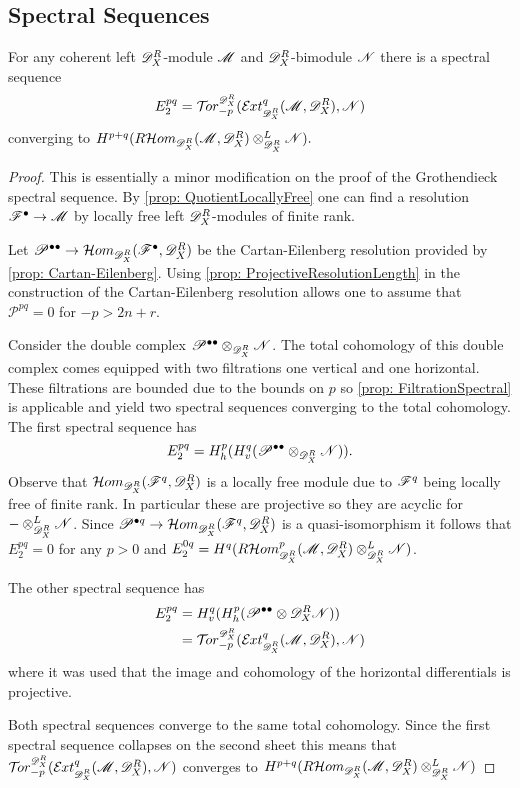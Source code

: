 \subsection{Spectral Sequences}
\begin{proposition}\label{prop: SpectralTorExt}
  For any coherent left $\mathscr{D}_X^R$-module $\mathscr{M}$ and $\mathscr{D}_X^R$-bimodule $\mathscr{N}$ there is a spectral sequence
  $$E_2^{pq}= \Tr{\D_X^R}{-p}(\Ex{\D_X^R}{q}(\M,\D_X^R), \N) $$
  converging to $H^{p+q} (R\mathcal{H}om_{\mathscr{D}_X^R}(\mathscr{M},\mathscr{D}_X^R)\otimes_{\mathscr{D}_X^R}^L \mathscr{N}).$
\end{proposition}
\begin{proof}
  This is essentially a minor modification on the proof of the Grothendieck spectral sequence.
  By \cref{prop: QuotientLocallyFree} one can find a resolution $\mathscr{F}^\bullet \to \mathscr{M}$ by locally free left $\mathscr{D}_X^R$-modules of finite rank.

  Let $\mathscr{P}^{\bullet\bullet}\to \mathcal{H}om_{\mathscr{D}_X^R}(\mathscr{F}^{\bullet},\mathscr{D}_X^R)$ be the Cartan-Eilenberg resolution provided by \cref{prop: Cartan-Eilenberg}.
  Using \cref{prop: ProjectiveResolutionLength} in the construction of the Cartan-Eilenberg resolution allows one to assume that $\mathscr{P}^{pq}=0$ for $-p>2n + r$.

  Consider the double complex $\mathscr{P}^{\bullet \bullet}\otimes_{\mathscr{D}_X^R}\mathscr{N}$.
  The total cohomology of this double complex comes equipped with two filtrations one vertical and one horizontal.
  These filtrations are bounded due to the bounds on $p$ so \cref{prop: FiltrationSpectral} is applicable and yield two spectral sequences converging to the total cohomology.
  The first spectral sequence has
  $$E_{2}^{pq} = H^p_h(H^q_v( \mathscr{P}^{\bullet \bullet}\otimes_{\mathscr{D}_X^R}\mathscr{N})).$$
  Observe that $\mathcal{H}om_{\mathscr{D}_X^R}(\mathscr{F}^q, \mathscr{D}_X^R)$ is a locally free module due to $\mathscr{F}^q$ being locally free of finite rank.
  In particular these are projective so they are acyclic for ${-}\otimes_{\mathscr{D}_X^R}^L \mathscr{N}$.
  Since $\mathscr{P}^{\bullet q}\to \mathcal{H}om_{\mathscr{D}_X^R}(\mathscr{F}^q,\mathscr{D}_X^R)$ is a quasi-isomorphism it follows that $E_2^{pq}=0$ for any $p>0$ and $E_2^{0q} = H^{q} (R\mathcal{H}om_{\mathscr{D}_X^R}^p(\mathscr{M},\mathscr{D}_X^R)\otimes_{\mathscr{D}_X^R}^L \mathscr{N})$.

  The other spectral sequence has
  \begin{align*}
      E_2^{pq} &= H^q_v(H^p_h(\mathscr{P}^{\bullet\bullet}\otimes \D_X^R\N))\\
      &=  \Tr{\D_X^R}{-p}(\Ex{\D_X^R}{q}(\M,\D_X^R), \N)
  \end{align*}
  where it was used that the image and cohomology of the horizontal differentials is projective.

  Both spectral sequences converge to the same total cohomology.
  Since the first spectral sequence collapses on the second sheet this means that $\Tr{\D_X^R}{-p}(\Ex{\D_X^R}{q}(\M,\D_X^R), \N)$ converges to $H^{p+q}( R\mathcal{H}om_{\mathscr{D}_X^R}(\mathscr{M},\mathscr{D}_X^R)\otimes_{\mathscr{D}_X^R}^L \mathscr{N})$
\end{proof}
